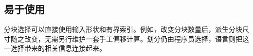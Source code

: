 \subsection*{易于使用}

分块选择可以直接使用输入形状和有界索引。例如，改变分块数量后，派生分块尺寸随之改变，无需另行维护一套手工偏移计算。划分仍由程序员选择，语言则把这一选择带来的相关信息连接起来。
